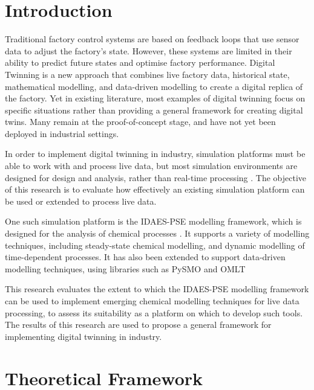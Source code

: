 \documentclass[12pt]{article}
\begin{document}
\section{Introduction}


Traditional factory control systems are based on feedback loops that use sensor data to adjust the factory's state. 
However, these systems are limited in their ability to predict future states and optimise factory performance. 
Digital Twinning is a new approach that combines live factory data, historical state, mathematical modelling, and data-driven modelling to create a digital replica of the factory. 
Yet in existing literature, most examples of digital twinning focus on specific situations rather than providing a general framework for creating digital twins.
Many remain at the proof-of-concept stage, and have not yet been deployed in industrial settings.

In order to implement digital twinning in industry, simulation platforms must be able to work with and process live data, but most simulation environments are designed for design and analysis, rather than real-time processing \cite{agi2024computational}. The objective of this research is to evaluate how effectively an existing simulation platform can be used or extended to process live data.

One such simulation platform is the IDAES-PSE modelling framework, which is designed for the analysis of chemical processes \cite{lee2021idaes}. 
It supports a variety of modelling techniques, including steady-state chemical modelling, and dynamic modelling of time-dependent processes. 
It has also been extended to support data-driven modelling techniques, using libraries such as PySMO and OMLT \cite{cecconOMLTOptimizationMachine2022} 


This research evaluates the extent to which the IDAES-PSE modelling framework can be used to implement emerging chemical modelling techniques for live data processing, to assess its suitability as a platform on which to develop such tools.
The results of this research are used to propose a general framework for implementing digital twinning in industry.


\section{Theoretical Framework}\label{sec:theoretical_framework}
\end{document}
